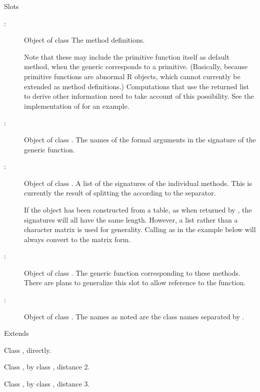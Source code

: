 \begin{Section}{Slots}

\begin{description}

\item[:] Object of class  The method
definitions.

Note that these may include the primitive function
itself as  default method,
when the generic corresponds to a primitive. (Basically, because
primitive functions are abnormal R objects, which cannot currently be
extended as method definitions.) Computations that use the returned
list to derive other information need to take account of this
possibility. See the implementation of 
for an example.

\item[:] Object of class .  The
names of the formal arguments in the signature of the generic function. 
\item[:] Object of class . A list of
the signatures of the individual methods.  This is currently the
result of splitting the  according to the 
separator.

If the object has been constructed from a table, as when returned by
, the signatures will all have the same length.
However, a list rather than a character matrix is used for
generality.  Calling  as in the example
below will always convert to the matrix form.
\item[:] Object of class .
The generic function corresponding to these methods.  There
are plans to generalize this slot to allow reference to the function.
\item[:] Object of class .  The
names as noted are the class names separated by  .

\end{description}

\end{Section}
%
\begin{Section}{Extends}

Class , directly.

Class , by class , distance 2.

Class , by class , distance 3.
\end{Section}
